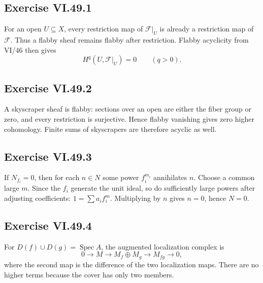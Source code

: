 \subsection*{Exercise VI.49.1}
\begin{solution}
For an open \(U\subseteq X\), every restriction map of \(\mathcal F|_U\) is already a restriction map of \(\mathcal F\).  Thus a flabby sheaf remains flabby after restriction.  Flabby acyclicity from VI/46 then gives
\[
H^q(U,\mathcal F|_U)=0\qquad(q>0).
\]
\end{solution}

\subsection*{Exercise VI.49.2}
\begin{solution}
A skyscraper sheaf is flabby: sections over an open are either the fiber group or zero, and every restriction is surjective.  Hence flabby vanishing gives zero higher cohomology.  Finite sums of skyscrapers are therefore acyclic as well.
\end{solution}

\subsection*{Exercise VI.49.3}
\begin{solution}
If \(N_{f_i}=0\), then for each \(n\in N\) some power \(f_i^{m_i}\) annihilates \(n\).  Choose a common large \(m\).  Since the \(f_i\) generate the unit ideal, so do sufficiently large powers after adjusting coefficients: \(1=\sum a_i f_i^m\).  Multiplying by \(n\) gives \(n=0\), hence \(N=0\).
\end{solution}

\subsection*{Exercise VI.49.4}
\begin{solution}
For \(D(f)\cup D(g)=\operatorname{Spec}A\), the augmented localization complex is
\[
0\to M\longrightarrow M_f\oplus M_g\longrightarrow M_{fg}\to0,
\]
where the second map is the difference of the two localization maps.  There are no higher terms because the cover has only two members.
\end{solution}

